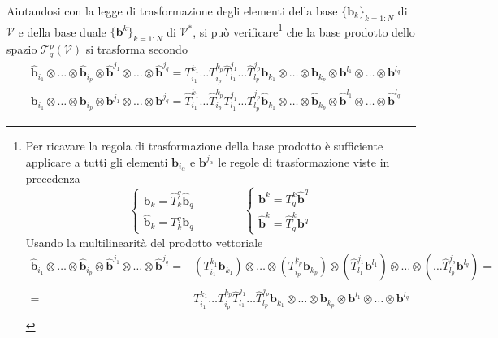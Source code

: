  \noindent
 Aiutandosi con la legge di trasformazione degli elementi della base $\{ \bm{b}_k \}_{k=1:N}$ di $\mathcal{V}$ 
 e della base duale $\{ \bm{b}^k \}_{k=1:N}$ di $\mathcal{V}^*$, si può verificare\footnote{
 Per ricavare la regola di trasformazione della base prodotto è sufficiente applicare a tutti gli elementi $\bm{b}_{i_\alpha}$ e 
 $\bm{b}^{j_\alpha}$ le regole di trasformazione viste in precedenza
 \begin{equation}
   \begin{cases}
     \bm{b}_k = \hat{T}^q_k \bm{\hat{b}}_q \\ \bm{\hat{b}}_k = T^q_k \bm{b}_q
   \end{cases} \qquad \qquad
   \begin{cases}
     \bm{b}^k = T^k_q \bm{\hat{b}}^q \\ \bm{\hat{b}}^k = \hat{T}^k_q \bm{b}^q
   \end{cases}
 \end{equation}
 Usando la multilinearità del prodotto vettoriale
 \begin{equation}
 \begin{aligned}
  \bm{\hat{b}}_{i_1} \otimes \dots \otimes \bm{\hat{b}}_{i_p} \otimes
   \bm{\hat{b}}^{j_1} \otimes \dots \otimes \bm{\hat{b}}^{j_q} = &
  ( T^{k_1}_{i_1}\bm{b}_{k_1} ) \otimes \dots \otimes ( T^{k_p}_{i_p}\bm{b}_{k_p}) \otimes
  ( \hat{T}^{j_1}_{l_1} \bm{b}^{l_1} ) \otimes \dots \otimes ( \dots \hat{T}^{j_p}_{l_p} \bm{b}^{l_q} ) = \\
  = & T^{k_1}_{i_1}\dots T^{k_p}_{i_p}\hat{T}^{j_1}_{l_1}\dots \hat{T}^{j_p}_{l_p}
   \bm{b}_{k_1} \otimes \dots \otimes \bm{b}_{k_p} \otimes
   \bm{b}^{l_1} \otimes \dots \otimes \bm{b}^{l_q} \\
 \end{aligned}
 \end{equation}
 }
  che la base prodotto dello spazio $\mathcal{T}^p_q(\mathcal{V})$ si trasforma secondo
\begin{equation}
\begin{aligned}
 &  \bm{\hat{b}}_{i_1} \otimes \dots \otimes \bm{\hat{b}}_{i_p} \otimes
   \bm{\hat{b}}^{j_1} \otimes \dots \otimes \bm{\hat{b}}^{j_q} = 
  T^{k_1}_{i_1}\dots T^{k_p}_{i_p}\hat{T}^{j_1}_{l_1}\dots \hat{T}^{j_p}_{l_p}
  \bm{b}_{k_1} \otimes \dots \otimes \bm{b}_{k_p} \otimes
   \bm{b}^{l_1} \otimes \dots \otimes \bm{b}^{l_q} \\
  &  \bm{b}_{i_1} \otimes \dots \otimes \bm{b}_{i_p} \otimes
   \bm{b}^{j_1} \otimes \dots \otimes \bm{b}^{j_q} = 
  \hat{T}^{k_1}_{i_1}\dots \hat{T}^{k_p}_{i_p} T ^{j_1}_{l_1}\dots T^{j_p}_{l_p}
  \bm{\hat{b}}_{k_1} \otimes \dots \otimes \bm{\hat{b}}_{k_p} \otimes
   \bm{\hat{b}}^{l_1} \otimes \dots \otimes \bm{\hat{b}}^{l_q}
\end{aligned}
\end{equation}
